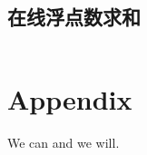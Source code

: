 \documentclass[titlepage, a4paper]{article}
\begin{document}
\begin{multicols}{2}
\begin{spacing}{0.6}
\subsection{在线浮点数求和}
\inputminted{cpp}{Tricks/在线浮点数求和.hpp}
\section{Appendix}

				
		\begin{comment}
		\end{comment}
		
		\end{spacing}
		\endgroup
	\end{multicols}
	\begin{center}
		\LARGE{We can and we will.}
	\end{center}
	
\end{document}
